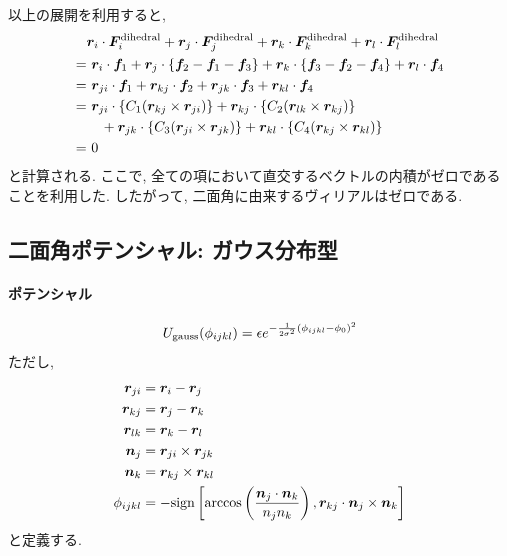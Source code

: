 以上の展開を利用すると, 
\begin{align}
   &\bm{r}_{i} \cdot \bm{F}_{i}^{\mathrm{dihedral}} +
    \bm{r}_{j} \cdot \bm{F}_{j}^{\mathrm{dihedral}} +
    \bm{r}_{k} \cdot \bm{F}_{k}^{\mathrm{dihedral}} +
    \bm{r}_{l} \cdot \bm{F}_{l}^{\mathrm{dihedral}}
 \notag
 \\
 =&~
    \bm{r}_{i} \cdot \bm{f}_{1}
   +\bm{r}_{j} \cdot \{\bm{f}_{2} - \bm{f}_{1} - \bm{f}_{3}\}
   +\bm{r}_{k} \cdot \{\bm{f}_{3} - \bm{f}_{2} - \bm{f}_{4}\}
   +\bm{r}_{l} \cdot \bm{f}_{4}
 \notag
 \\
 =&~
    \bm{r}_{ji} \cdot \bm{f}_{1}
   +\bm{r}_{kj} \cdot \bm{f}_{2}
   +\bm{r}_{jk} \cdot \bm{f}_{3}
   +\bm{r}_{kl} \cdot \bm{f}_{4}
 \notag
 \\
 =&~
    \bm{r}_{ji} \cdot \{ C_{1} (\bm{r}_{kj} \times \bm{r}_{ji}) \}
   +\bm{r}_{kj} \cdot \{ C_{2} (\bm{r}_{lk} \times \bm{r}_{kj}) \}
 \notag
 \\
   &~~~
   +\bm{r}_{jk} \cdot \{ C_{3} (\bm{r}_{ji} \times \bm{r}_{jk}) \}
   +\bm{r}_{kl} \cdot \{ C_{4} (\bm{r}_{kj} \times \bm{r}_{kl}) \}
 \notag
 \\
 =&~
   0
 \notag
\end{align}
と計算される. ここで, 全ての項において直交するベクトルの内積がゼロであることを利用した. 
したがって, 二面角に由来するヴィリアルはゼロである. 

\clearpage
\subsection{二面角ポテンシャル: ガウス分布型}
\paragraph{ポテンシャル}
\begin{equation}
   U_{\mathrm{gauss}} (\phi_{ijkl})
   =
   \epsilon
   e^{-\frac{1}{2\sigma^{2}}(\phi_{ijkl} - \phi_{0})^{2}}
   \notag
\end{equation}
ただし, 
\begin{alignat}{1}
 \bm{r}_{ji} &= \bm{r}_{i} - \bm{r}_{j}
 \notag \\
 \bm{r}_{kj} &= \bm{r}_{j} - \bm{r}_{k}
 \notag \\
 \bm{r}_{lk} &= \bm{r}_{k} - \bm{r}_{l}
 \notag \\
 \bm{n}_{j}  &= \bm{r}_{ji} \times \bm{r}_{jk}
 \notag \\
 \bm{n}_{k}  &= \bm{r}_{kj} \times \bm{r}_{kl}
 \notag
 \\
 \phi_{ijkl} &=
 - \mathrm{sign}
   \left[
         \arccos \left( \frac{\bm{n}_{j} \cdot \bm{n}_{k}}{n_{j} n_{k}}\right),
         \bm{r}_{kj} \cdot \bm{n}_{j} \times \bm{n}_{k}
   \right]
 \notag
\end{alignat}
と定義する.

